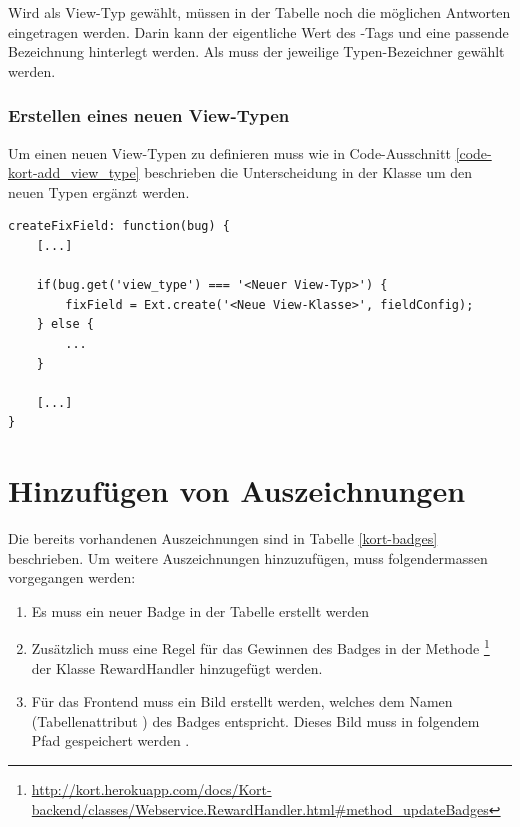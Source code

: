 Wird als View-Typ  gewählt, müssen in der Tabelle  noch die möglichen Antworten eingetragen werden.
Darin kann der eigentliche Wert des -Tags und eine passende Bezeichnung hinterlegt werden.
Als  muss der jeweilige Typen-Bezeichner gewählt werden.

\subsubsection{Erstellen eines neuen View-Typen}
Um einen neuen View-Typen zu definieren muss wie in Code-Ausschnitt \ref{code-kort-add_view_type} beschrieben die Unterscheidung in der Klasse  um den neuen Typen ergänzt werden.

\lstset{language=JavaScript}
\begin{lstlisting}[caption=Unterscheidung der View-Typen in Kort.view.bugmap.fix.Form, label=code-kort-add_view_type]
createFixField: function(bug) {
	[...]
	
	if(bug.get('view_type') === '<Neuer View-Typ>') {
		fixField = Ext.create('<Neue View-Klasse>', fieldConfig);
	} else {
		...
	}
	
	[...]
}
\end{lstlisting}

\section{Hinzufügen von Auszeichnungen}
\label{kort-additional-badges}
Die bereits vorhandenen Auszeichnungen sind in Tabelle \ref{kort-badges} beschrieben. Um weitere Auszeichnungen hinzuzufügen, muss folgendermassen vorgegangen werden:

\begin{enumerate}
\item Es muss ein neuer Badge in der Tabelle  erstellt werden
\item Zusätzlich muss eine Regel für das Gewinnen des Badges in der Methode \footnote{\url{http://kort.herokuapp.com/docs/Kort-backend/classes/Webservice.RewardHandler.html\#method_updateBadges}} der Klasse RewardHandler hinzugefügt werden.
\item Für das Frontend muss ein Bild erstellt werden, welches dem Namen (Tabellenattribut ) des Badges entspricht. Dieses Bild muss in folgendem Pfad gespeichert werden .
\end{enumerate}

